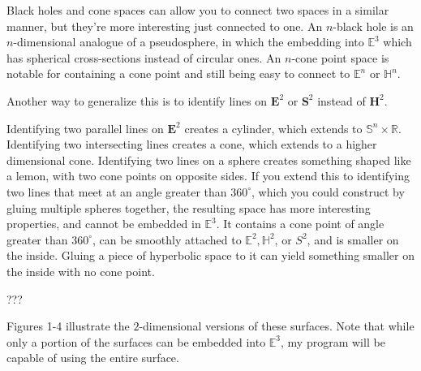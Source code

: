 \documentclass[12pt]{amsart}
\begin{document}
Black holes and cone spaces can allow you to connect two spaces in a similar manner, but they're more interesting just connected to one. An $n$-black hole is an $n$-dimensional analogue of a pseudosphere, in which the embedding into $\mathbb{E}^3$ which has spherical cross-sections instead of circular ones. An $n$-cone point space is notable for containing a cone point and still being easy to connect to $\mathbb{E}^n$ or $\mathbb{H}^n$.

Another way to generalize this is to identify lines on $\textbf{E}^2$ or $\textbf{S}^2$ instead of $\textbf{H}^2$.

Identifying two parallel lines on $\textbf{E}^2$ creates a cylinder, which extends to $\mathbb{S}^n \times \mathbb{R}$. Identifying two intersecting lines creates a cone, which extends to a higher dimensional cone. Identifying two lines on a sphere creates something shaped like a lemon, with two cone points on opposite sides. If you extend this to identifying two lines that meet at an angle greater than $360^\circ$, which you could construct by gluing multiple spheres together, the resulting space has more interesting properties, and cannot be embedded in $\mathbb{E}^3$.  It contains a cone point of angle greater than $360^\circ$, can be smoothly attached to $\mathbb{E}^2, \mathbb{H}^2$, or $S^2$, and is smaller on the inside. Gluing a piece of hyperbolic space to it can yield something smaller on the inside with no cone point.

???

Figures 1-4 illustrate the $2$-dimensional versions of these surfaces. Note that while only a portion of the surfaces can be embedded into $\mathbb{E}^3$, my program will be capable of using the entire surface.
\end{document}
